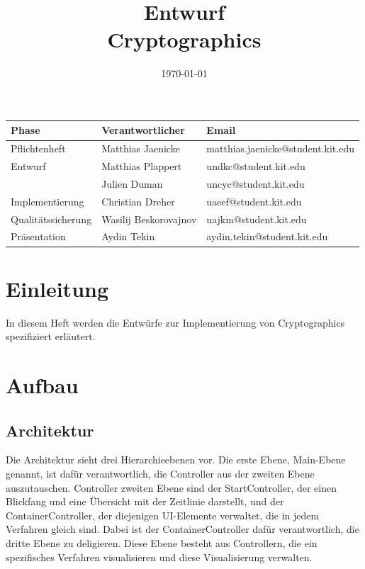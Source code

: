 \documentclass{article}
\title{\textbf{Entwurf} \\ Cryptographics}
\author{}
\date{\today}
\begin{document}
\maketitle
\begin{table}[b]
  \begin{tabular}{| l | l | l |}
    \hline
    \textbf{Phase} & \textbf{Verantwortlicher} & \textbf{Email} \\ \hline
    Pflichtenheft & Matthias Jaenicke & matthias.jaenicke@student.kit.edu \\ \hline
    Entwurf & Matthias Plappert & undkc@student.kit.edu \\
            & Julien Duman & uncyc@student.kit.edu \\ \hline
    Implementierung & Christian Dreher & uaeef@student.kit.edu \\ \hline
    Qualitätssicherung & Wasilij Beskorovajnov & uajkm@student.kit.edu \\ \hline
    Präsentation & Aydin Tekin & aydin.tekin@student.kit.edu \\ \hline
    \end{tabular}
\end{table}
\thispagestyle{empty}
\newpage

\tableofcontents
\newpage

\section{Einleitung}
In diesem Heft werden die Entwürfe zur Implementierung von Cryptographics spezifiziert erläutert.

\section{Aufbau}

\subsection{Architektur}
Die Architektur sieht drei Hierarchieebenen vor. Die erste Ebene, Main-Ebene genannt,
ist dafür verantwortlich, die Controller aus der zweiten Ebene auszutauschen. Controller
zweiten Ebene sind der StartController, der einen Blickfang und eine Übersicht mit der
Zeitlinie darstellt, und der ContainerController, der diejenigen UI-Elemente verwaltet,
die in jedem Verfahren gleich sind. Dabei ist der ContainerController dafür verantwortlich,
die dritte Ebene zu deligieren. Diese Ebene besteht aus Controllern, die ein spezifisches
Verfahren visualisieren und diese Visualisierung verwalten.
\end{document}
